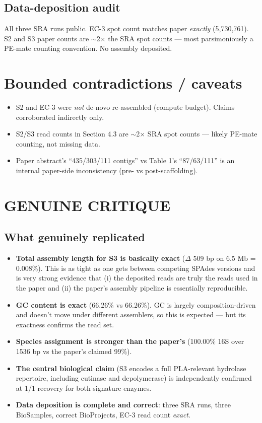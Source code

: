 \documentclass[11pt]{article}
\begin{document}
\subsection{Data-deposition audit}
All three SRA runs public. EC-3 spot count matches paper \emph{exactly}
(5{,}730{,}761). S2 and S3 paper counts are $\sim$2$\times$ the SRA spot counts
--- most parsimoniously a PE-mate counting convention. No assembly deposited.

\section{Bounded contradictions / caveats}
\begin{itemize}
\item S2 and EC-3 were \emph{not} de-novo re-assembled (compute budget). Claims corroborated indirectly only.
\item S2/S3 read counts in Section 4.3 are $\sim$2$\times$ SRA spot counts --- likely PE-mate counting, not missing data.
\item Paper abstract's ``435/303/111 contigs'' vs Table 1's ``87/63/111'' is an internal paper-side inconsistency (pre- vs post-scaffolding).
\end{itemize}

\section{GENUINE CRITIQUE}

\subsection*{What genuinely replicated}
\begin{itemize}
\item \textbf{Total assembly length for S3 is basically exact} ($\Delta$ 509 bp on 6.5 Mb = 0.008\%). This is as tight as one gets between competing SPAdes versions and is very strong evidence that (i) the deposited reads are truly the reads used in the paper and (ii) the paper's assembly pipeline is essentially reproducible.
\item \textbf{GC content is exact} (66.26\% vs 66.26\%). GC is largely composition-driven and doesn't move under different assemblers, so this is expected --- but its exactness confirms the read set.
\item \textbf{Species assignment is stronger than the paper's} (100.00\% 16S over 1536 bp vs the paper's claimed 99\%).
\item \textbf{The central biological claim} (S3 encodes a full PLA-relevant hydrolase repertoire, including cutinase and depolymerase) is independently confirmed at 1/1 recovery for both signature enzymes.
\item \textbf{Data deposition is complete and correct}: three SRA runs, three BioSamples, correct BioProjects, EC-3 read count \emph{exact}.
\end{itemize}
\end{document}
